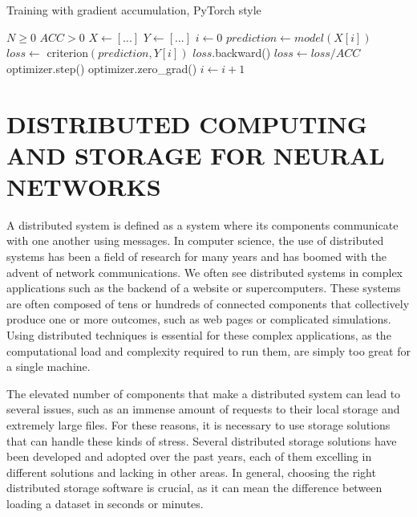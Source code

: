 \begin{algorithm}
    \caption{Training with gradient accumulation, PyTorch style}\label{alg:grad-acc-training}
    \begin{algorithmic}
        \Require $N \geq 0$
        \Require $ACC > 0$
        \State $X \gets [...]$ 
        \State $Y \gets [...]$ 
        \State $i \gets 0$
        \State $prediction \gets model(X[i])$
        \State $loss \gets $ criterion$(prediction, Y[i])$
        \State $loss$.backward()
        \State $loss \gets loss / ACC$
        \State optimizer.step()
        \State optimizer.zero\_grad()
        \EndIf
        \State $i \gets i + 1$
        \EndWhile
    \end{algorithmic}
\end{algorithm}

\section{DISTRIBUTED COMPUTING AND STORAGE FOR NEURAL NETWORKS}

A distributed system is defined as a system where its components communicate with one another using messages.
In computer science, the use of distributed systems has been a field of research for many years and has boomed with the advent of network communications.
We often see distributed systems in complex applications such as the backend of a website or supercomputers.
These systems are often composed of tens or hundreds of connected components that collectively produce one or more outcomes, such as web pages or complicated simulations.
Using distributed techniques is essential for these complex applications, as the computational load and complexity required to run them, are simply too great for a single machine.

The elevated number of components that make a distributed system can lead to several issues, such as an immense amount of requests to their local storage and extremely large files.
For these reasons, it is necessary to use storage solutions that can handle these kinds of stress.
Several distributed storage solutions have been developed and adopted over the past years, each of them excelling in different solutions and lacking in other areas.
In general, choosing the right distributed storage software is crucial, as it can mean the difference between loading a dataset in seconds or minutes.

